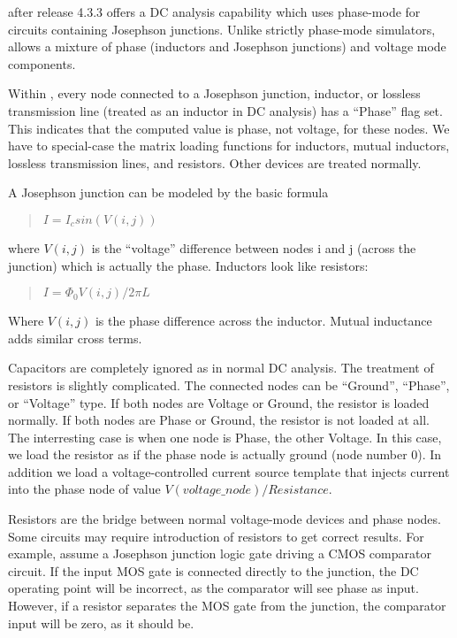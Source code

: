 {\WRspice} after release 4.3.3 offers a DC analysis capability which
uses phase-mode for circuits containing Josephson junctions.  Unlike
strictly phase-mode simulators, {\WRspice} allows a mixture of phase
(inductors and Josephson junctions) and voltage mode components.

Within {\WRspice}, every node connected to a Josephson junction,
inductor, or lossless transmission line (treated as an inductor in DC
analysis) has a ``Phase'' flag set.  This indicates that the computed
value is phase, not voltage, for these nodes.  We have to special-case
the matrix loading functions for inductors, mutual inductors, lossless
transmission lines, and resistors.  Other devices are treated
normally.

A Josephson junction can be modeled by the basic formula

\begin{quote}
$I = I_c sin(V(i,j))$
\end{quote}

where $V(i,j)$ is the ``voltage'' difference between nodes i and j
(across the junction) which is actually the phase.  Inductors look
like resistors:

\begin{quote}
$I = \Phi_0 V(i,j)/2{\pi}L$
\end{quote}

Where $V(i,j)$ is the phase difference across the inductor.  Mutual
inductance adds similar cross terms.

Capacitors are completely ignored as in normal DC analysis.  The
treatment of resistors is slightly complicated.  The connected nodes
can be ``Ground'', ``Phase'', or ``Voltage'' type.  If both nodes are
Voltage or Ground, the resistor is loaded normally.  If both nodes are
Phase or Ground, the resistor is not loaded at all.  The interresting
case is when one node is Phase, the other Voltage.  In this case, we
load the resistor as if the phase node is actually ground (node number
0).  In addition we load a voltage-controlled current source template
that injects current into the phase node of value
$V(voltage\_node)/Resistance$.

Resistors are the bridge between normal voltage-mode devices and phase
nodes.  Some circuits may require introduction of resistors to get
correct results.  For example, assume a Josephson junction logic gate
driving a CMOS comparator circuit.  If the input MOS gate is connected
directly to the junction, the DC operating point will be incorrect, as
the comparator will see phase as input.  However, if a resistor
separates the MOS gate from the junction, the comparator input will be
zero, as it should be.

